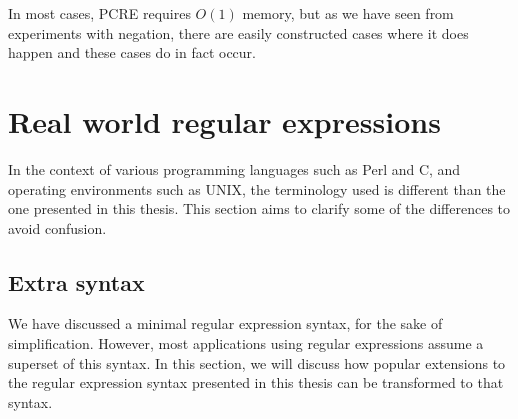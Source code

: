 In most cases, PCRE requires $O(1)$ memory, but as we have seen from experiments
with negation, there are easily constructed cases where it does happen and these
cases do in fact occur.


\section{Real world regular expressions}

In the context of various programming languages such as Perl and C, and
operating environments such as UNIX, the terminology used is different than the
one presented in this thesis. This section aims to clarify some of the
differences to avoid confusion.


\subsection{Extra syntax}

We have discussed a minimal regular expression syntax, for the sake of
simplification. However, most applications using regular expressions assume a
superset of this syntax. In this section, we will discuss how popular extensions
to the regular expression syntax presented in this thesis can be transformed to
that syntax.

